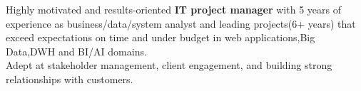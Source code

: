 Highly motivated and results-oriented \textbf{IT project manager} with 5 years of experience as business/data/system analyst and leading projects(6+ years)  that exceed expectations on time and under budget in web applications,Big Data,DWH and BI/AI  domains.\\ Adept at stakeholder management, client engagement, and building strong relationships with customers.